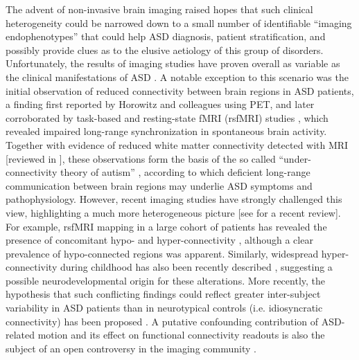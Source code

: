 The advent of non-invasive brain imaging raised hopes that such clinical
heterogeneity could be narrowed down to a small number of identifiable “imaging
endophenotypes” that could help ASD diagnosis, patient stratification, and
possibly provide clues as to the elusive aetiology of this group of disorders.
Unfortunately, the results of imaging studies have proven overall as variable as
the clinical manifestations of ASD \parencite{ecker2015, stanfield2008}. A
notable exception to this scenario was the initial observation of reduced
connectivity between brain regions in ASD patients, a finding first reported by
Horowitz and colleagues \parencite{horwitz1988} using PET, and later
corroborated by task-based \parencite{just2004} and resting-state fMRI (rsfMRI)
studies \parencite{assaf2010, cherkassky2006, kennedy2008}, which revealed
impaired long-range synchronization in spontaneous brain activity. Together with
evidence of reduced white matter connectivity detected with MRI [reviewed in
\parencite{anagnostou2011}], these observations form the basis of the so called
“under-connectivity theory of autism” \parencite{anagnostou2011, just2012},
according to which deficient long-range communication between brain regions may
underlie ASD symptoms and pathophysiology. However, recent imaging studies have
strongly challenged this view, highlighting a much more heterogeneous picture
[see \parencite{vasa2016} for a recent review]. For example, rsfMRI mapping in a
large cohort of patients has revealed the presence of concomitant hypo- and
hyper-connectivity \parencite{dimartino2014a}, although a clear prevalence of
hypo-connected regions was apparent. Similarly, widespread hyper-connectivity
during childhood has also been recently described \parencite{keown2013,
supekar2013, uddin2013}, suggesting a possible neurodevelopmental origin for
these alterations. More recently, the hypothesis that such conflicting findings
could reflect greater inter-subject variability in ASD patients than in
neurotypical controls (i.e. idiosyncratic connectivity) has been proposed
\parencite{hahamy2015}. A putative confounding contribution of ASD-related
motion and its effect on functional connectivity readouts is also the subject of
an open controversy in the imaging community \parencite{deen2012, power2015,
power2012, pardoe2016}. 

